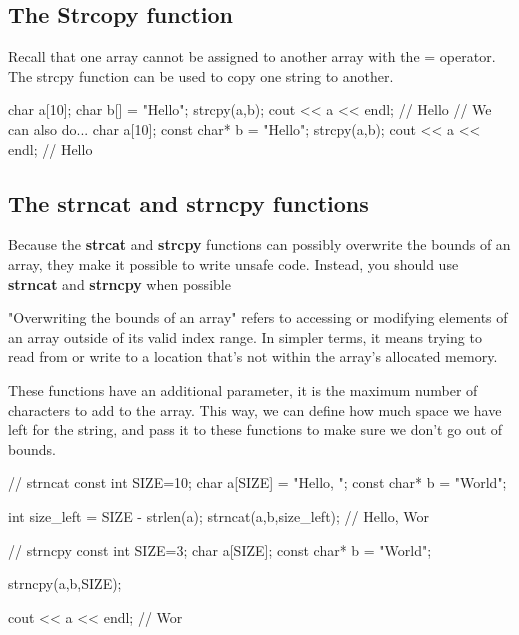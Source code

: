 \documentclass{report}
\begin{document}
    \bigbreak \noindent 
    \subsection{The Strcopy function}
    \bigbreak \noindent 
    Recall that one array cannot be assigned to another array with the = operator. The strcpy function can be used to copy one string to another.
    \bigbreak \noindent 

    \begin{cppcode}
        char a[10];
        char b[] = "Hello";
        strcpy(a,b);
        cout << a << endl; // Hello
        // We can also do...
        char a[10];
        const char* b = "Hello";
        strcpy(a,b);
        cout << a << endl; // Hello
    \end{cppcode}

    \bigbreak \noindent 
    \bigbreak \noindent 

    \pagebreak
    \subsection{The strncat and strncpy functions}
    \bigbreak \noindent 
    Because the \textbf{strcat} and \textbf{strcpy} functions can possibly overwrite the bounds of an array, they make it possible to write unsafe code. Instead, you should use \textbf{strncat} and \textbf{strncpy} when possible
    \bigbreak \noindent 
    \begin{remark}
        "Overwriting the bounds of an array" refers to accessing or modifying elements of an array outside of its valid index range. In simpler terms, it means trying to read from or write to a location that's not within the array's allocated memory.
    \end{remark}
    \bigbreak \noindent 
    These functions have an additional parameter, it is the maximum number of characters to add to the array. This way, we can define how much space we have left for the string, and pass it to these functions to make sure we don't go out of bounds.
    \bigbreak \noindent 

    \begin{cppcode}
        // strncat
        const int SIZE=10;
        char a[SIZE] = "Hello, ";
        const char* b = "World";

        int size_left = SIZE - strlen(a);
        strncat(a,b,size_left); // Hello, Wor

        // strncpy
        const int SIZE=3;
        char a[SIZE];
        const char* b = "World";

        strncpy(a,b,SIZE);

        cout << a << endl; // Wor
    \end{cppcode}
\end{document}
